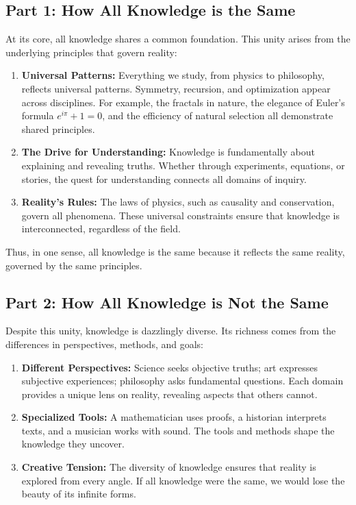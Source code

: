 \documentclass[12pt]{article}
\begin{document}
\subsection*{Part 1: How All Knowledge is the Same}
At its core, all knowledge shares a common foundation. This unity arises from the underlying principles that govern reality:
\begin{enumerate}
    \item \textbf{Universal Patterns:} Everything we study, from physics to philosophy, reflects universal patterns. Symmetry, recursion, and optimization appear across disciplines. For example, the fractals in nature, the elegance of Euler's formula $e^{i\pi} + 1 = 0$, and the efficiency of natural selection all demonstrate shared principles.
    
    \item \textbf{The Drive for Understanding:} Knowledge is fundamentally about explaining and revealing truths. Whether through experiments, equations, or stories, the quest for understanding connects all domains of inquiry.
    
    \item \textbf{Reality's Rules:} The laws of physics, such as causality and conservation, govern all phenomena. These universal constraints ensure that knowledge is interconnected, regardless of the field.
\end{enumerate}

Thus, in one sense, all knowledge is the same because it reflects the same reality, governed by the same principles.

\subsection*{Part 2: How All Knowledge is Not the Same}
Despite this unity, knowledge is dazzlingly diverse. Its richness comes from the differences in perspectives, methods, and goals:
\begin{enumerate}
    \item \textbf{Different Perspectives:} Science seeks objective truths; art expresses subjective experiences; philosophy asks fundamental questions. Each domain provides a unique lens on reality, revealing aspects that others cannot.
    
    \item \textbf{Specialized Tools:} A mathematician uses proofs, a historian interprets texts, and a musician works with sound. The tools and methods shape the knowledge they uncover.
    
    \item \textbf{Creative Tension:} The diversity of knowledge ensures that reality is explored from every angle. If all knowledge were the same, we would lose the beauty of its infinite forms.
\end{enumerate}
\end{document}
